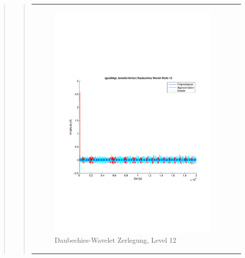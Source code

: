\begin{quote}
\begin{quote}
\begin{center}
\begin{tabular}{ll}
\begin{minipage}{0.6\textwidth}
                    \end{minipage}
                    \begin{minipage}{0.6\textwidth}
    
                        \begin{figure}[H]
                            \label{fig:}
                            \includegraphics[scale=0.4, trim = 2cm 6cm 1cm
                            7.5cm,
                            clip]{./Bilder/Termin8/lamellenfehler_gesaettigt_Daubechies_Wavlet_lvl_12}
                            \caption{Daubechies-Wavelet Zerlegung, Level 12}
                        \end{figure}
                    \vspace{-1.5em}
    

\end{minipage}
\end{tabular}
\end{center}
\end{quote}
\end{quote}
